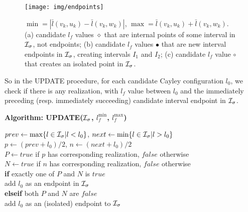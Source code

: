 \documentclass[secthm,amsthm,english]{article}
\theoremstyle{definition}
\theoremstyle{remark}
\begin{document}
\begin{figure}[h]
	 
	 
	  
	
	 
	
	\begin{centering}
	\texttt{[image: img/endpoints]} 
	\par\end{centering}
	
	\caption{$\min=|\bar{l}(v_{k},u_{k})-\bar{l}(v_{k},w_{k})|$, $\max=\bar{l}(v_{k},u_{k})+\bar{l}(v_{k},w_{k})$.
	(a) candidate $l_f$ values $\diamond$ that are internal points of some interval in ${\cal I}_{\sigma}$, not endpoints;
	(b) candidate $l_f$ values $\bullet$ that are new interval endpoints
	in ${\cal I}_{\sigma}$, creating intervals $I_{1}$ and $I_{2}$; 
	(c) candidate $l_f$ value $\circ$ that creates an isolated point in ${\cal I}_{\sigma}$. }


\label{F:endpoints} 
\end{figure}


So in the UPDATE procedure, 
for each candidate Cayley configuration $l_0$, 
we check if there is any realization, with $l_f$ value between $l_0$
and the immediately preceding (resp. immediately succeeding) candidate interval endpoint 
in ${\cal I}_{\sigma}$. 



\noindent \textbf{Algorithm: UPDATE(${\cal I}_{\sigma}$, $l_f^{\min}$, $l_f^{\max}$)} 

\indent $prev \gets \max \{ l \in {\cal I}_{\sigma} | l < l_0 \}$, {   }  $next \gets \min \{ l \in {\cal I}_{\sigma} | l > l_0 \}$ \\ \indent $p \gets (prev+l_0)/2$, {   } $n \gets (next+l_0)/2$ \\ \indent $P \gets true$ if $p$ has corresponding realization, $false$ otherwise \\
\indent $N \gets true$ if $n$ has corresponding realization, $false$ otherwise \\
\indent \textbf{if} exactly one of $P$ and $N$ is $true$  \\
	\indent \indent add $l_0$ as an endpoint in ${\cal I}_{\sigma}$ \\
\indent \textbf{elseif} both $P$ and $N$ are $false$ \\
	\indent \indent add $l_0$ as an (isolated) endpoint to ${\cal I}_{\sigma}$ 
\end{document}
